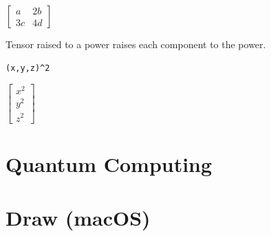 \documentclass[12pt]{article}
\begin{document}
\noindent
$\displaystyle
\begin{bmatrix}
a & 2b
\\[1ex]
3c & 4d
\end{bmatrix}
$

\bigskip
\noindent
Tensor raised to a power raises each component to the power.

{\color{blue}
\begin{verbatim}
(x,y,z)^2
\end{verbatim}
}

\noindent
$\displaystyle
\begin{bmatrix}
x^2
\\[1ex]
y^2
\\[1ex]
z^2
\end{bmatrix}
$

\newpage

















\newpage

\section{Quantum Computing}



\newpage

\section{Draw (macOS)}



\newpage



\newpage


\end{document}
